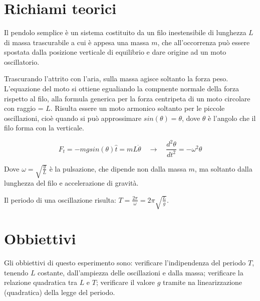 \documentclass[12pt, a4paper]{article}
\title{\textbf{\scalebox{1.4}{\text{Misura di g tramite il pendolo}}}}
\date{}
\begin{document}
\maketitle
{}%


\section{Richiami teorici}
Il pendolo semplice è un sistema costituito da un filo inestensibile di lunghezza $L$ di massa trascurabile a cui è appesa una massa $m$, che all'occorrenza può essere spostata dalla posizione verticale di equilibrio e dare origine ad un moto oscillatorio. 

Trascurando l'attrito con l'aria, sulla massa agisce soltanto la forza peso. 
L'equazione del moto si ottiene egualiando la compnente normale della forza rispetto al filo, alla formula generica per la forza centripeta di un moto circolare con raggio = $L$.
Risulta essere un moto armonico soltanto per le piccole oscillazioni, cioè quando si può approssimare $sin(\theta) = \theta$, dove $\theta$ è l'angolo che il filo forma con la verticale. 

\begin{equation}
        F_t = -mg sin(\theta)\hat{t} = mL\ddot{\theta}   \quad \xrightarrow{} \quad   \frac{d^2\theta}{dt^2} = -\omega^2\theta 
\end{equation}

Dove $\omega = \sqrt{\frac{g}{L}}$ è la pulsazione, che dipende non dalla massa $m$, ma soltanto dalla lunghezza del filo e accelerazione di gravità. 

Il periodo di una oscillazione risulta: $T = \frac{2\pi}{\omega} = 2\pi\sqrt{\frac{L}{g}}$.



\section{Obbiettivi}
Gli obbiettivi di questo esperimento sono: 
verificare l'indipendenza del periodo $T$, tenendo $L$ costante, dall'ampiezza delle oscillazioni e dalla massa;
verificare la relazione quadratica tra $L$ e $T$; 
verificare il valore $g$ tramite na linearizzazione (quadratica) della legge del periodo.
\end{document}
